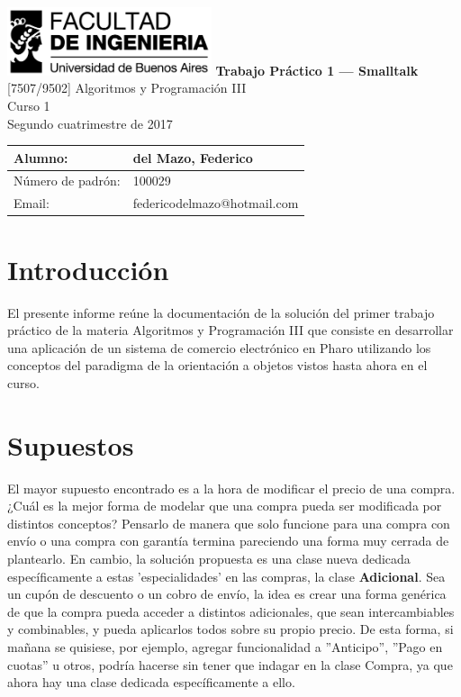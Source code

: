\documentclass[titlepage,a4paper]{article}
\begin{document}
\begin{titlepage} %
	\hfill\includegraphics[width=6cm]{logofiuba.jpg}
    \centering
    \vfill
    \Huge \textbf{Trabajo Práctico 1 — Smalltalk}
    \vskip2cm
    \Large [7507/9502] Algoritmos y Programación III\\
    Curso 1 \\ %
    Segundo cuatrimestre de 2017 
    \vfill
    \begin{tabular}{ | l | l | } %
      \hline
      Alumno: & del Mazo, Federico \\ \hline
      Número de padrón: & 100029 \\ \hline
      Email: & federicodelmazo@hotmail.com \\ \hline
  	\end{tabular}
    \vfill
    \vfill
\end{titlepage}

\tableofcontents %
\newpage

\section{Introducción}\label{sec:intro}
El presente informe reúne la documentación de la solución del primer trabajo práctico de la materia Algoritmos y Programación III que consiste en desarrollar una aplicación de un sistema de comercio electrónico en Pharo utilizando los conceptos del paradigma de la orientación a objetos vistos hasta ahora en el curso.

\section{Supuestos}\label{sec:supuestos}

El mayor supuesto encontrado es a la hora de modificar el precio de una compra. ¿Cuál es la mejor forma de modelar que una compra pueda ser modificada por distintos conceptos? Pensarlo de manera que solo funcione para una compra con envío o una compra con garantía termina pareciendo una forma muy cerrada de plantearlo. En cambio, la solución propuesta es una clase nueva dedicada específicamente a estas 'especialidades' en las compras, la clase \textbf{Adicional}. Sea un cupón de descuento o un cobro de envío, la idea es crear una forma genérica de que la compra pueda acceder a distintos adicionales, que sean intercambiables y combinables, y pueda aplicarlos todos sobre su propio precio. De esta forma, si mañana se quisiese, por ejemplo, agregar funcionalidad a ''Anticipo'', ''Pago en cuotas'' u otros, podría hacerse sin tener que indagar en la clase Compra, ya que ahora hay una clase dedicada específicamente a ello.
\end{document}
